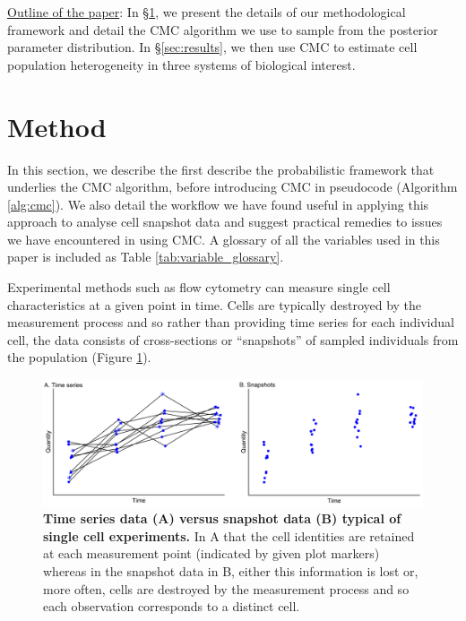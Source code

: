 \documentclass[10pt,letterpaper]{article}
\begin{document}
\underline{Outline of the paper}: In \S \ref{sec:method}, we present the details of our methodological framework and detail the CMC algorithm we use to sample from the posterior parameter distribution. In \S \ref{sec:results}, we then use CMC to estimate cell population heterogeneity in three systems of biological interest.

\section{Method}\label{sec:method}
In this section, we describe the first describe the probabilistic framework that underlies the CMC algorithm, before introducing CMC in pseudocode (Algorithm \ref{alg:cmc}). We also detail the workflow we have found useful in applying this approach to analyse cell snapshot data and suggest practical remedies to issues we have encountered in using CMC. A glossary of all the variables used in this paper is included as Table \ref{tab:variable_glossary}.

Experimental methods such as flow cytometry can measure single cell characteristics at a given point in time. Cells are typically destroyed by the measurement process and so rather than providing time series for each individual cell, the data consists of cross-sections or ``snapshots'' of sampled individuals from the population (Figure \ref{fig:time_series_v_snapshots}).

\begin{figure}[H]
	\centerline{\includegraphics[width=\textwidth]{../figures/time_series_v_snapshots.pdf}}
	\caption{\textbf{Time series data (A) versus snapshot data (B) typical of single cell experiments.} In A that the cell identities are retained at each measurement point (indicated by given plot markers) whereas in the snapshot data in B, either this information is lost or, more often, cells are destroyed by the measurement process and so each observation corresponds to a distinct cell.}
	\label{fig:time_series_v_snapshots}
\end{figure}
\end{document}

